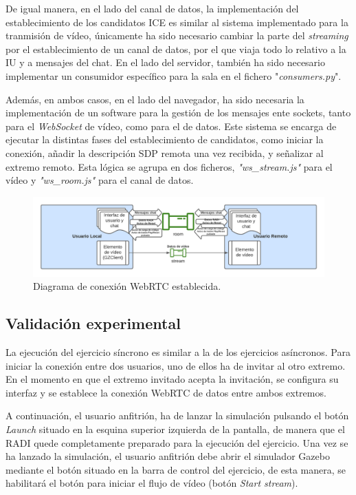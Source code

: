 \documentclass[a4paper, 12pt]{book}
\begin{document}
De igual manera, en el lado del canal de datos, la implementación del establecimiento de los candidatos ICE es similar al sistema implementado para la tranmisión de vídeo, únicamente ha sido necesario cambiar la parte del \emph{streaming} por el establecimiento de un canal de datos, por el que viaja todo lo relativo a la IU y a mensajes del chat. En el lado del servidor, también ha sido necesario implementar un consumidor específico para la sala en el fichero "\emph{consumers.py}".

Además, en ambos casos, en el lado del navegador, ha sido necesaria la implementación de un software para la gestión de los mensajes ente sockets, tanto para el \emph{WebSocket} de vídeo, como para el de datos. Este sistema se encarga de ejecutar la distintas fases del establecimiento de candidatos, como iniciar la conexión, añadir la descripción SDP remota una vez recibida, y señalizar al extremo remoto. Esta lógica se agrupa en dos ficheros, \emph{"ws\_stream.js"} para el vídeo y \emph{"ws\_room.js"} para el canal de datos.

\begin{figure}[H]
	\centering
    \includegraphics[width=15cm]{img/diagrama_conexion_webrtc.png}
    \caption{Diagrama de conexión WebRTC establecida.}
    \label{figura:diagrama_conexion_webrtc}
\end{figure}

\subsection{Validación experimental}

La ejecución del ejercicio síncrono es similar a la de los ejercicios asíncronos. Para iniciar la conexión entre dos usuarios, uno de ellos ha de invitar al otro extremo. En el momento en que el extremo invitado acepta la invitación, se configura su interfaz y se establece la conexión WebRTC de datos entre ambos extremos. 



A continuación, el usuario anfitrión, ha de lanzar la simulación pulsando el botón \emph{Launch} situado en la esquina superior izquierda de la pantalla, de manera que el RADI quede completamente preparado para la ejecución del ejercicio. Una vez se ha lanzado la simulación, el usuario anfitrión debe abrir el simulador Gazebo mediante el botón situado en la barra de control del ejercicio, de esta manera, se habilitará el botón para iniciar el flujo de vídeo (botón \emph{Start stream}). 
\end{document}
